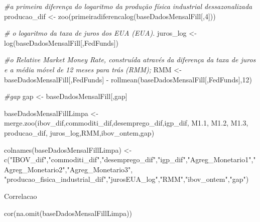 \documentclass[
]{article}
\newenvironment{Shaded}{\begin{snugshade}}{\end{snugshade}}
\newcommand{\CommentTok}[1]{\textcolor[rgb]{0.56,0.35,0.01}{\textit{#1}}}
\newcommand{\DecValTok}[1]{\textcolor[rgb]{0.00,0.00,0.81}{#1}}
\newcommand{\FloatTok}[1]{\textcolor[rgb]{0.00,0.00,0.81}{#1}}
\newcommand{\FunctionTok}[1]{\textcolor[rgb]{0.00,0.00,0.00}{#1}}
\newcommand{\NormalTok}[1]{#1}
\newcommand{\OtherTok}[1]{\textcolor[rgb]{0.56,0.35,0.01}{#1}}
\newcommand{\SpecialCharTok}[1]{\textcolor[rgb]{0.00,0.00,0.00}{#1}}
\newcommand{\StringTok}[1]{\textcolor[rgb]{0.31,0.60,0.02}{#1}}
\begin{document}
\begin{Shaded}
\begin{Highlighting}[]
\CommentTok{\#a primeira diferença do logaritmo da produção física industrial dessazonalizada}
\NormalTok{producao\_dif }\OtherTok{\textless{}{-}} \FunctionTok{zoo}\NormalTok{(}\FunctionTok{primeiradiferencalog}\NormalTok{(baseDadosMensalFill[,}\DecValTok{4}\NormalTok{]))}

\CommentTok{\# o logaritmo da taxa de juros dos EUA (EUA).}
\NormalTok{juros\_log }\OtherTok{\textless{}{-}} \FunctionTok{log}\NormalTok{(baseDadosMensalFill[,}\StringTok{\textquotesingle{}FedFunds\textquotesingle{}}\NormalTok{])}

\CommentTok{\#o Relative Market Money Rate, construída através da diferença da taxa de juros e a média móvel de 12 meses para trás (RMM);}
\NormalTok{RMM }\OtherTok{\textless{}{-}}\NormalTok{ baseDadosMensalFill[,}\StringTok{\textquotesingle{}FedFunds\textquotesingle{}}\NormalTok{] }\SpecialCharTok{{-}} \FunctionTok{rollmean}\NormalTok{(baseDadosMensalFill[,}\StringTok{\textquotesingle{}FedFunds\textquotesingle{}}\NormalTok{],}\DecValTok{12}\NormalTok{)}

\CommentTok{\#gap}
\NormalTok{gap }\OtherTok{\textless{}{-}}\NormalTok{ baseDadosMensalFill[,}\StringTok{\textquotesingle{}gap\textquotesingle{}}\NormalTok{]}

\NormalTok{baseDadosMensalFillLimpa }\OtherTok{\textless{}{-}} \FunctionTok{merge.zoo}\NormalTok{(ibov\_dif,commoditi\_dif,desemprego\_dif,igp\_dif, M1}\FloatTok{.1}\NormalTok{, M1}\FloatTok{.2}\NormalTok{, M1}\FloatTok{.3}\NormalTok{, producao\_dif, juros\_log,RMM,ibov\_ontem,gap)}

\FunctionTok{colnames}\NormalTok{(baseDadosMensalFillLimpa) }\OtherTok{\textless{}{-}} \FunctionTok{c}\NormalTok{(}\StringTok{"IBOV\_dif"}\NormalTok{,}\StringTok{"commoditi\_dif"}\NormalTok{,}\StringTok{"desemprego\_dif"}\NormalTok{,}\StringTok{"igp\_dif"}\NormalTok{,}\StringTok{"Agreg\_Monetario1"}\NormalTok{,}\StringTok{"Agreg\_Monetario2"}\NormalTok{,}\StringTok{"Agreg\_Monetario3"}\NormalTok{,}
                                        \StringTok{"producao\_fisica\_industrial\_dif"}\NormalTok{,}\StringTok{"jurosEUA\_log"}\NormalTok{,}\StringTok{"RMM"}\NormalTok{,}\StringTok{"ibov\_ontem"}\NormalTok{,}\StringTok{"gap"}\NormalTok{)}
\end{Highlighting}
\end{Shaded}

Correlacao

\begin{Shaded}
\begin{Highlighting}[]
\FunctionTok{cor}\NormalTok{(}\FunctionTok{na.omit}\NormalTok{(baseDadosMensalFillLimpa))}
\end{Highlighting}
\end{Shaded}
\end{document}
